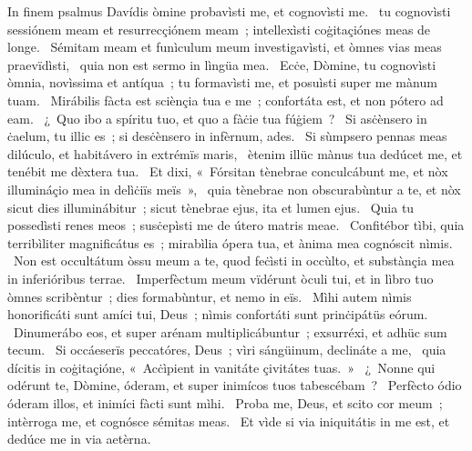 { In finem psalmus Davídis}
{%
òmine probavìsti me, et cognovìsti me. 
~tu cognovìsti sessiónem meam et resurrecçiónem meam~; intellexìsti coġitaçiónes meas de longe. 
~Sémitam meam et funìculum meum investigavìsti, et òmnes vias meas praevïdìsti, 
~quia non est sermo in lìngüa mea. 
~Ecċe, Dòmine, tu cognovìsti òmnia, novìssima et antíqua~; tu formavìsti me, et posuìsti super me mànum tuam. 
~Mirábilis fàcta est sciènçia tua e me~; confortáta est, et non pótero ad eam. 
~¿~Quo ibo a spíritu tuo, et quo a fàċie tua fúġiem~? 
~Si asċènsero in ċaelum, tu illic es~; si desċènsero in infèrnum, ades. 
~Si sùmpsero pennas meas dilúculo, et habitávero in extrémïs maris, 
~ètenim illüc mànus tua dedúcet me, et tenébit me dèxtera tua. 
~Et dixi, «~Fórsitan tènebrae conculcábunt me, et nòx illumináçio mea in delìċiïs meïs~», 
~quia tènebrae non obscurabùntur a te, et nòx sicut dies illuminábitur~; sicut tènebrae ejus, ita et lumen ejus. 
~Quia tu possedìsti renes meos~; susċepìsti me de útero matris meae. 
~Confitébor tìbi, quia terribìliter magnificátus es~; mirabìlia ópera tua, et ànima mea cognóscit nìmis. 
~Non est occultátum òssu meum a te, quod feċìsti in occùlto, et substànçia mea in inferióribus terrae. 
~Imperfèctum meum vïdérunt òculi tui, et in lìbro tuo òmnes scribèntur~; dies formabùntur, et nemo in eïs. 
~Mìhi autem nìmis honorificáti sunt amíci tui, Deus~; nìmis confortáti sunt prinċipátüs eórum. 
~Dinumerábo eos, et super arénam multiplicábuntur~; exsurréxi, et adhüc sum tecum. 
~Si occáeserïs peccatóres, Deus~; vìri sángüinum, declináte a me, 
~quia dícitis in coġitaçióne, «~Acċìpient in vanitáte çivitátes tuas.~»
~¿~Nonne qui odérunt te, Dòmine, óderam, et super inimícos tuos tabescébam~? 
~Perfècto ódio óderam illos, et inimíci fàcti sunt mìhi. 
~Proba me, Deus, et scito cor meum~; intèrroga me, et cognósce sémitas meas. 
~Et vìde si via iniquitátis in me est, et dedúce me in via aetèrna. 
}
